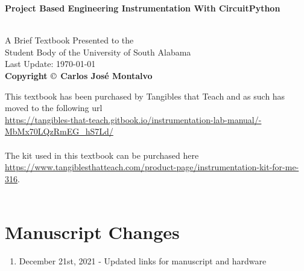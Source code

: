 \documentclass{article}
\begin{document}
\begin{center}
\begin{LARGE}{\bf Project Based Engineering Instrumentation With CircuitPython}\end{LARGE}\\
\large
\vspace{22 mm}
   A Brief Textbook Presented to the \\ 
   Student Body of the University of South Alabama \\
\vspace{22 mm}
\vspace{22 mm}
\vspace{22 mm}
       Last Update: \today\\
{\bf Copyright $\copyright$ Carlos Jos\'{e} Montalvo}
\end{center}

\linespread{1}

\newpage

\noindent This textbook has been purchased by Tangibles that Teach and as such
has moved to the following url\\
\url{https://tangibles-that-teach.gitbook.io/instrumentation-lab-manual/-MbMx70LQzRmEG_hS7Ld/}
\ \\
\ \\
The kit used in this textbook can be purchased here\\
\url{https://www.tangiblesthatteach.com/product-page/instrumentation-kit-for-me-316}.
\ \\
\ \\
\section*{Manuscript Changes}

\begin{enumerate}[itemsep=-5pt]
\item December 21st, 2021 - Updated links for manuscript and hardware
\end{enumerate}

\newpage


%

%

%
\end{document}

